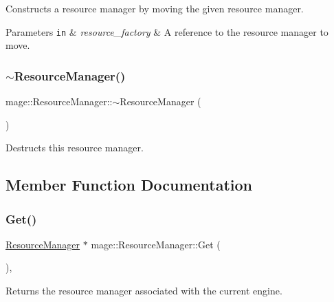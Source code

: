 Constructs a resource manager by moving the given resource manager.


\begin{DoxyParams}[1]{Parameters}
\mbox{\tt in}  & {\em resource\+\_\+factory} & A reference to the resource manager to move. \\
\hline
\end{DoxyParams}
\hypertarget{classmage_1_1_resource_manager_ad4bed85d3656f90072c5d47f50618add}{}\label{classmage_1_1_resource_manager_ad4bed85d3656f90072c5d47f50618add} 
\subsubsection{\texorpdfstring{$\sim$\+Resource\+Manager()}{~ResourceManager()}}
{\footnotesize\ttfamily mage\+::\+Resource\+Manager\+::$\sim$\+Resource\+Manager (\begin{DoxyParamCaption}{ }\end{DoxyParamCaption})\hspace{0.3cm}{\ttfamily [virtual]}}

Destructs this resource manager. 

\subsection{Member Function Documentation}
\hypertarget{classmage_1_1_resource_manager_a1e6ca77d892578fc4df0e62dfbc807f6}{}\label{classmage_1_1_resource_manager_a1e6ca77d892578fc4df0e62dfbc807f6} 
\subsubsection{\texorpdfstring{Get()}{Get()}}
{\footnotesize\ttfamily \hyperlink{classmage_1_1_resource_manager}{Resource\+Manager} $\ast$ mage\+::\+Resource\+Manager\+::\+Get (\begin{DoxyParamCaption}{ }\end{DoxyParamCaption})\hspace{0.3cm}{\ttfamily [static]}, {\ttfamily [noexcept]}}

Returns the resource manager associated with the current engine.

